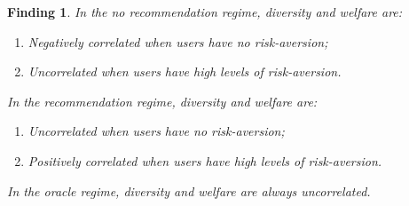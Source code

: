 \documentclass[manuscript]{acmart}
\newtheorem{finding}{Finding}
\begin{document}
\begin{finding}\label{finding_diversity_welfare_corr}
In the no recommendation regime, diversity and welfare are:
\begin{enumerate}
\item Negatively correlated when users have no risk-aversion;
\item Uncorrelated when users have high levels of risk-aversion.
\end{enumerate}
In the recommendation regime, diversity and welfare are:
\begin{enumerate}
\item Uncorrelated when users have no risk-aversion;
\item Positively correlated when users have high levels of risk-aversion.
\end{enumerate}
In the oracle regime, diversity and welfare are always uncorrelated.
\end{finding}
\end{document}
